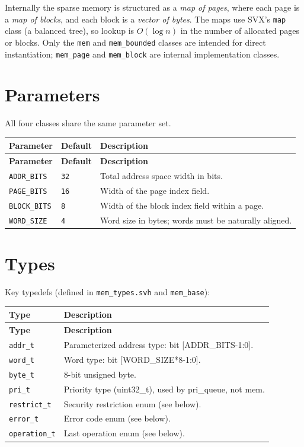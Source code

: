 \documentclass[11pt,letterpaper]{report}
\begin{document}
Internally the sparse memory is structured as a \emph{map of pages}, where
each page is a \emph{map of blocks}, and each block is a \emph{vector of
bytes}.  The maps use SVX's \texttt{map} class (a balanced tree), so
lookup is $O(\log n)$ in the number of allocated pages or blocks.  Only the
\texttt{mem} and \texttt{mem\_bounded} classes are intended for direct
instantiation; \texttt{mem\_page} and \texttt{mem\_block} are internal
implementation classes.

\section{Parameters}

All four classes share the same parameter set.

\begin{xltabular}{\linewidth}{llX}
\toprule
\textbf{Parameter} & \textbf{Default} & \textbf{Description} \\
\midrule
\endfirsthead
\toprule
\textbf{Parameter} & \textbf{Default} & \textbf{Description} \\
\midrule
\endhead
\bottomrule
\endlastfoot
\texttt{ADDR\_BITS} & \texttt{32} & Total address space width in bits. \\
\texttt{PAGE\_BITS} & \texttt{16} & Width of the page index field. \\
\texttt{BLOCK\_BITS} & \texttt{8} & Width of the block index field within a page. \\
\texttt{WORD\_SIZE} & \texttt{4} & Word size in bytes; words must be naturally aligned. \\
\end{xltabular}

\section{Types}

Key typedefs (defined in \texttt{mem\_types.svh} and \texttt{mem\_base}):

\begin{xltabular}{\linewidth}{lX}
\toprule
\textbf{Type} & \textbf{Description} \\
\midrule
\endfirsthead
\toprule
\textbf{Type} & \textbf{Description} \\
\midrule
\endhead
\bottomrule
\endlastfoot
\texttt{addr\_t} & Parameterized address type: bit [ADDR\_BITS-1:0]. \\
\texttt{word\_t} & Word type: bit [WORD\_SIZE*8-1:0]. \\
\texttt{byte\_t} & 8-bit unsigned byte. \\
\texttt{pri\_t} & Priority type (uint32\_t), used by pri\_queue, not mem. \\
\texttt{restrict\_t} & Security restriction enum (see below). \\
\texttt{error\_t} & Error code enum (see below). \\
\texttt{operation\_t} & Last operation enum (see below). \\
\end{xltabular}
\end{document}
